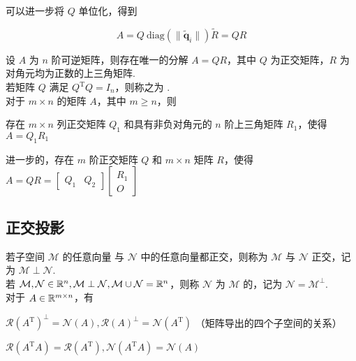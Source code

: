 \documentclass[./main.tex]{subfiles}
\begin{document}
可以进一步将 $Q$ 单位化，得到

\begin{equation}
    A=Q\ \mathrm{diag}(\|\widetilde{\bm{q}}_i\|)\widetilde{R}=QR
\end{equation}

设 $A$ 为 $n$ 阶可逆矩阵，则存在唯一的分解 $A=QR$，其中 $Q$ 为正交矩阵，$R$ 为对角元均为正数的上三角矩阵. \\

若矩阵 $Q$ 满足 $Q^{\mathrm{T}}Q=I_n$，则称之为 . \\

对于 $m\times n$ 的矩阵 $A$，其中 $m\ge n$，则
\begin{enumerate*}
    \item {}存在 $m\times n$ 列正交矩阵 $Q_1$ 和具有非负对角元的 $n$ 阶上三角矩阵 $R_1$，使得 $A=Q_1R_1$
    \item {}进一步的，存在 $m$ 阶正交矩阵 $Q$ 和 $m\times n$ 矩阵 $R$，使得 $A=QR=\begin{bmatrix}Q_1&Q_2\end{bmatrix}\begin{bmatrix}R_1\\O\end{bmatrix}$
\end{enumerate*}

\subsection{正交投影}
若子空间 $\mathcal{M}$ 的任意向量 与 $\mathcal{N}$ 中的任意向量都正交，则称为 $\mathcal{M}$ 与 $\mathcal{N}$ 正交，记为 $\mathcal{M}\perp\mathcal{N}$. \\\indent 若 $\mathcal{M},\mathcal{N}\in\mathbb{R}^{n},\mathcal{M}\perp\mathcal{N},\mathcal{M}\cup\mathcal{N}=\mathbb{R}^{n}$，则称 $\mathcal{N}$ 为 $\mathcal{M}$ 的，记为 $\mathcal{N}=\mathcal{M}^{\perp}$. \\

对于 $A\in\mathbb{R}^{m\times n}$，有
\begin{enumerate*}
    \item $\mathcal{R}(A^{\mathrm{T}})^{\perp}=\mathcal{N}(A),\mathcal{R}(A)^{\perp}=\mathcal{N}(A^{\mathrm{T}})$ （矩阵导出的四个子空间的关系）
    \item $\mathcal{R}(A^{\mathrm{T}}A)=\mathcal{R}(A^{\mathrm{T}}),\mathcal{N}(A^{\mathrm{T}}A)=\mathcal{N}(A)$
\end{enumerate*}
\end{document}
